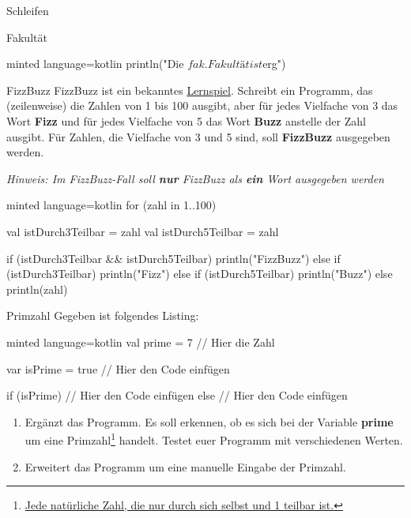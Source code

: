 \begin{task}[points=auto]{Schleifen}
\begin{subtask*}[points=0]{Fakultät }
\begin{solution}
\begin{codeBlock}[]{minted language=kotlin}
            println("Die $fak. Fakultät ist $erg")
            \end{codeBlock}
        \end{solution}
    \end{subtask*}
    \begin{subtask*}[points=0]{FizzBuzz }
        FizzBuzz ist ein bekanntes \href{https://en.wikipedia.org/wiki/Fizz_buzz}{Lernspiel}. Schreibt ein Programm, das (zeilenweise) die Zahlen von 1 bis 100 ausgibt, aber für jedes Vielfache von 3 das Wort \textbf{Fizz} und für jedes Vielfache von 5 das Wort \textbf{Buzz} anstelle der Zahl ausgibt. Für Zahlen, die Vielfache von 3 und 5 sind, soll \textbf{FizzBuzz} ausgegeben werden.

        \textit{Hinweis: Im FizzBuzz-Fall soll \textbf{nur} FizzBuzz als \textbf{ein} Wort ausgegeben werden}

        \begin{solution}
            \begin{codeBlock}[]{minted language=kotlin}
                for (zahl in 1..100) {
                    val istDurch3Teilbar = zahl %
                    val istDurch5Teilbar = zahl %

                    if (istDurch3Teilbar && istDurch5Teilbar) {
                        println("FizzBuzz")
                    } else if (istDurch3Teilbar) {
                        println("Fizz")
                    } else if (istDurch5Teilbar) {
                        println("Buzz")
                    } else {
                        println(zahl)
                    }
                }
            \end{codeBlock}
        \end{solution}
    \end{subtask*}
    \begin{subtask*}[points=0]{Primzahl }
        Gegeben ist folgendes Listing:
        \begin{codeBlock}[]{minted language=kotlin}
                val prime = 7 // Hier die Zahl

                var isPrime = true
                // Hier den Code einfügen

                if (isPrime) {
                    // Hier den Code einfügen
                } else {
                    // Hier den Code einfügen
                }
        \end{codeBlock}
        \begin{enumerate}
            \item Ergänzt das Programm. Es soll erkennen, ob es sich bei der Variable \textbf{prime} um eine Primzahl\footnote{\href{https://de.wikipedia.org/wiki/Primzahl}{Jede natürliche Zahl, die nur durch sich selbst und 1 teilbar ist.}} handelt. Testet euer Programm mit verschiedenen Werten.
            \item Erweitert das Programm um eine manuelle Eingabe der Primzahl.
        \end{enumerate}


\end{subtask*}
\end{task}
